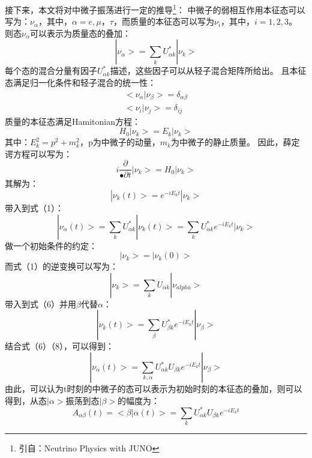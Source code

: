 \documentclass[10pt,a4paper]{article}
\begin{document}
接下来，本文将对中微子振荡进行一定的推导\footnote{引自：Neutrino Physics with JUNO}：
中微子的弱相互作用本征态可以写为：$\nu_{\alpha}$，其中，$\alpha=e,\mu，\tau$，而质量的本征态可以写为$\nu_{i}$，其中，$i=1,2,3$。
则态$\nu_{\alpha}$可以表示为质量态的叠加：
\begin{equation}
|\nu_{\alpha}>=\sum_{k}U_{\alpha k}^{*}|\nu_{k}>
\end{equation}
每个态的混合分量有因子$U_{\alpha k}^{*}$描述，这些因子可以从轻子混合矩阵所给出。
且本征态满足归一化条件和轻子混合的统一性：
\begin{equation}
\begin{split}
<\nu_{\alpha}|\nu_{\beta}>=\delta_{\alpha\beta}\\
<\nu_{i}|\nu_{j}>=\delta_{ij}
\end{split}
\end{equation}
质量的本征态满足Hamitonian方程：
\begin{equation}
H_{0}|\nu_{k}>=E_{k}|\nu_{k}>
\end{equation}
其中：$E_{k}^2=p^2+m_{k}^2$，p为中微子的动量，$m_{k}$为中微子的静止质量。
因此，薛定谔方程可以写为：
\begin{equation}
i\frac{\partial}{•\partial t}|\nu_{k}>=H_{0}|\nu_{k}>
\end{equation}
其解为：
\begin{equation}
|\nu_{k}(t)>=e^{-iE_{k}t}|\nu_{k}>
\end{equation}
带入到式（1）：
\begin{equation}
|\nu_{\alpha}(t)>=\sum_{k}U_{\alpha k}^{*}|\nu_{k}(t)>=\sum_{k}U_{\alpha k}^{*}e^{-iE_{k}t}|\nu_{k}>
\end{equation}
做一个初始条件的约定：
\[|\nu_{k}>=|\nu_{k}(0)>\]
而式（1）的逆变换可以写为：
\begin{equation}
|\nu_{k}>=\sum_{k}U_{\alpha k}|\nu_{alpha}>
\end{equation}
带入到式（6）并用$\beta$代替$\alpha$：
\begin{equation}
|\nu_{k}(t)>=\sum_{\beta}U_{\beta k}^{*}e^{-iE_{k}t}|\nu_{\beta}>
\end{equation}
结合式（6）（8），可以得到：
\begin{equation}
|\nu_{\alpha}(t)>=\sum_{k,\alpha}U_{\alpha k}^{*}U_{\beta k}e^{-iE_{k}t}|\nu_{\beta}>
\end{equation}
由此，可以认为t时刻的中微子的态可以表示为初始时刻的本征态的叠加，则可以得到，从态$|\alpha>$振荡到态$|\beta>$的幅度为：
\begin{equation}
A_{\alpha\beta}(t)=<\beta|\alpha(t)>=\sum_{k}U_{\alpha k}^{*}U_{\beta k}e^{-iE_{k}t}
\end{equation}
\end{document}
